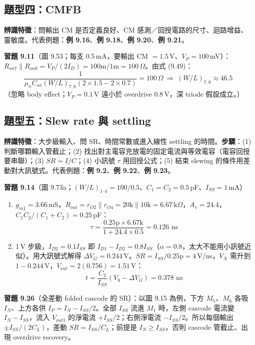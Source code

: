 \documentclass[11pt,a4paper]{article}
\newcommand{\pl}{\mathbin{\|}}
\newcommand{\exref}[1]{\textcolor{extag}{\textbf{\sffamily 例 #1}}}
\begin{document}
\subsection{題型四：CMFB}
\textbf{辨識特徵}：問輸出 CM 是否定義良好、CM 感測／回授電路的尺寸、迴路增益、靈敏度。代表例題：\exref{9.16}、\exref{9.18}、\exref{9.20}、\exref{9.21}。

\textbf{習題 9.11}（圖 9.53；每支 0.5\,mA，要輸出 CM $=1.5$\,V、$V_P=100$\,mV）：$R_{on7}\pl R_{on8}=V_P/(2I_D)=100\text{m}/1\text{m}=100\,\Omega$。由式 (9.49)：
\[
\frac{1}{\mu_nC_{ox}(W/L)_{7,8}(2\times1.5-2\times0.7)}=100\,\Omega\ \Rightarrow\ \boxed{(W/L)_{7,8}\approx46.5}
\]
（忽略 body effect；$V_P=0.1$\,V 遠小於 overdrive $0.8$\,V，深 triode 假設成立。）

\subsection{題型五：Slew rate 與 settling}
\textbf{辨識特徵}：大步級輸入、問 SR、時間常數或進入線性 settling 的時間。\textbf{步驟}：(1) 判斷哪顆輸入管截止；(2) 找出對主電容充放電的固定電流與等效電容（電容回授要串聯）；(3) $SR=I/C$；(4) 小訊號 $\tau$ 用回授公式；(5) 結束 slewing 的條件用差動對大訊號式。代表例題：\exref{9.2}、\exref{9.22}、\exref{9.23}。

\textbf{習題 9.14}（圖 9.73a；$(W/L)_{1\text{--}4}=100/0.5$、$C_1=C_2=0.5$\,pF、$I_{SS}=1$\,mA）
\begin{enumerate}[label=(\alph*),leftmargin=2.2em]
  \item $g_{m1}=3.66$\,mS，$R_{out}=r_{O2}\pl r_{O4}=20\text{k}\pl10\text{k}=6.67$\,k$\Omega$，$A_v=24.4$，$C_1C_2/(C_1+C_2)=0.25$\,pF：
  \[\tau=\frac{0.25\text{p}\times6.67\text{k}}{1+24.4\times0.5}=\boxed{0.126\text{ ns}}\]
  \item 1\,V 步級，$I_{D2}=0.1I_{SS}$ 即 $I_{D1}-I_{D2}=0.8I_{SS}$（$\alpha=0.8$，太大不能用小訊號近似）。用大訊號式解得 $\Delta V_G=0.244$\,V。$SR=I_{SS}/0.25\text{p}=4$\,V/ns，$V_X$ 需升到 $1-0.244$\,V，$V_{out}=2(0.756)=1.51$\,V：
  \[t=\frac{C_2}{I_{SS}}(V_0-\Delta V_G)=\boxed{0.378\text{ ns}}\]
\end{enumerate}

\textbf{習題 9.26}（全差動 folded cascode 的 SR）：以圖 9.15 為例，下方 $M_5$、$M_6$ 各吸 $I_N$、上方各供 $I_P=I_N-I_{SS}/2$。全部 $I_{SS}$ 流進 $M_1$ 時，左側 cascode 電流變 $I_N-I_{SS}$，流入 $V_{out1}$ 的淨電流 $+I_{SS}/2$；右側淨電流 $-I_{SS}/2$。所以每個輸出 $\pm I_{SS}/(2C_L)$，差動 $\boxed{SR=I_{SS}/C_L}$；前提是 $I_N\ge I_{SS}$，否則 cascode 管截止、出現 overdrive recovery。
\end{document}

